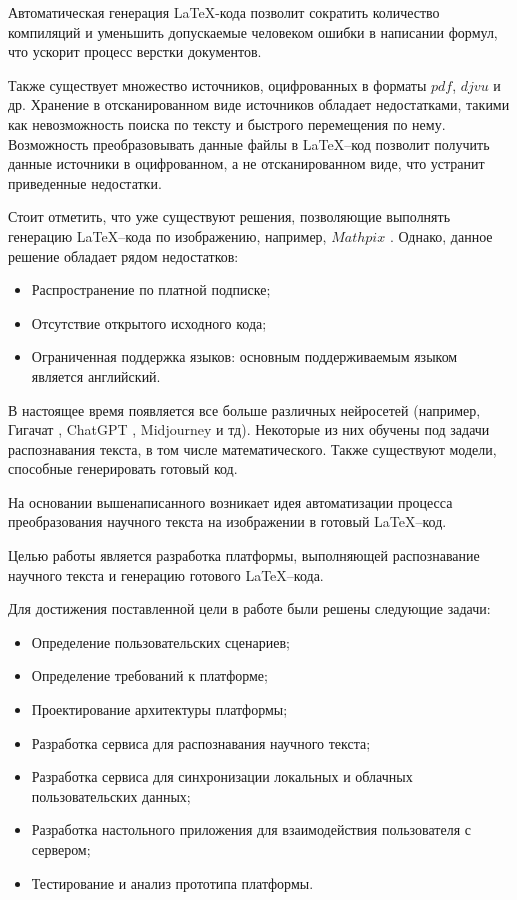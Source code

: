 Автоматическая генерация \LaTeX\--кода позволит сократить количество компиляций и уменьшить допускаемые человеком ошибки в написании формул, что ускорит процесс верстки документов.

Также существует множество источников, оцифрованных в форматы $pdf$, $djvu$ и др. 
Хранение в отсканированном виде источников обладает недостатками, такими как невозможность поиска по тексту и быстрого перемещения по нему.
Возможность преобразовывать данные файлы в \LaTeX--код позволит получить данные источники в оцифрованном, а не отсканированном виде, что устранит приведенные недостатки.

Стоит отметить, что уже существуют решения, позволяющие выполнять генерацию \LaTeX--кода по изображению, например, $Mathpix$ \cite{mathpix}. Однако, данное решение обладает рядом недостатков:
\begin{itemize}
    \item Распространение по платной подписке;
    \item Отсутствие открытого исходного кода;
    \item Ограниченная поддержка языков: основным поддерживаемым языком является английский.
\end{itemize}

В настоящее время появляется все больше различных нейросетей (например, Гигачат \cite{gigachat}, ChatGPT \cite{chat_gpt}, Midjourney \cite{midjourney} и тд). Некоторые из них обучены под задачи распознавания текста, в том числе математического. 
Также существуют модели, способные генерировать готовый код. 

На основании вышенаписанного возникает идея автоматизации процесса преобразования научного текста на изображении в готовый \LaTeX--код.


Целью работы является разработка платформы, выполняющей распознавание научного текста и  генерацию готового \LaTeX--кода.

Для достижения поставленной цели в работе были решены следующие задачи:
\begin{itemize}
    \item Определение пользовательских сценариев;
    \item Определение требований к платформе;
    \item Проектирование архитектуры платформы;
    \item Разработка сервиса для распознавания научного текста;
    \item Разработка сервиса для синхронизации локальных и облачных пользовательских данных;
    \item Разработка настольного приложения для взаимодействия пользователя с сервером;
    \item Тестирование и анализ прототипа платформы.
\end{itemize}

